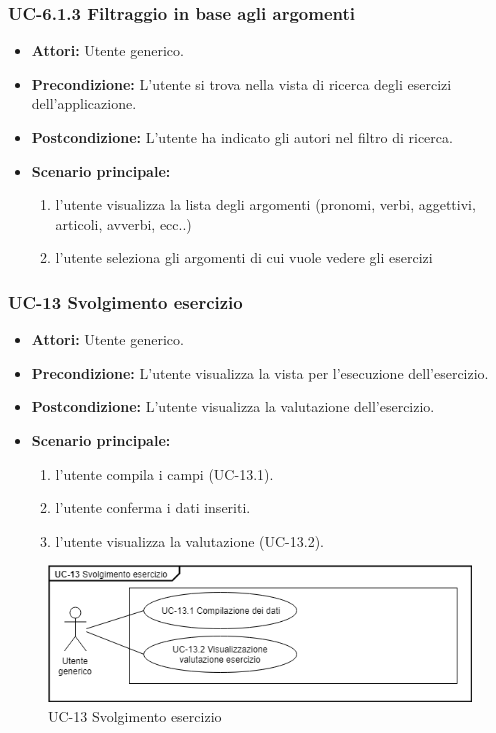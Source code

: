 	\subsubsection{UC-6.1.3 Filtraggio in base agli argomenti}
		\begin{itemize}
			\item \textbf{Attori:} Utente generico.
			\item \textbf{Precondizione: } L'utente si trova nella vista di ricerca degli esercizi dell'applicazione.
			\item \textbf{Postcondizione: } L'utente ha indicato gli autori nel filtro di ricerca.
			\item \textbf{Scenario principale:}
			\begin{enumerate}
				\item l'utente visualizza la lista degli argomenti (pronomi, verbi, aggettivi, articoli, avverbi, ecc..)
				\item l'utente seleziona gli argomenti di cui vuole vedere gli esercizi
			\end{enumerate}
		\end{itemize}

	\subsubsection{UC-13 Svolgimento esercizio}
		\begin{itemize}
			\item \textbf{Attori:} Utente generico.
			\item \textbf{Precondizione:}  L'utente visualizza la vista per l'esecuzione dell'esercizio.
			\item \textbf{Postcondizione:} L'utente visualizza la valutazione dell'esercizio.
			\item \textbf{Scenario principale:}
				\begin{enumerate}
					\item l'utente compila i campi (UC-13.1).
					\item l'utente conferma i dati inseriti.
					\item l'utente visualizza la valutazione (UC-13.2).
				\end{enumerate}
		\end{itemize}
			
		\begin{figure}[h]
			\centering
			\includegraphics[scale=0.7]{images/UC-13.png}
			\caption{UC-13 Svolgimento esercizio}
		\end{figure}

